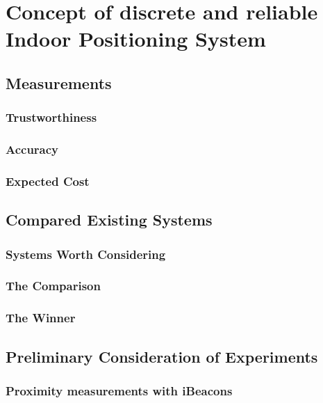 \section{Concept of discrete and reliable Indoor Positioning System}\label{concept} %

\subsection{Measurements}

\subsubsection{Trustworthiness}

\subsubsection{Accuracy}

\subsubsection{Expected Cost}

\subsection{Compared Existing Systems}

\subsubsection{Systems Worth Considering}

\subsubsection{The Comparison}

\subsubsection{The Winner}

\subsection{Preliminary Consideration of Experiments}

\subsubsection{Proximity measurements with iBeacons}

